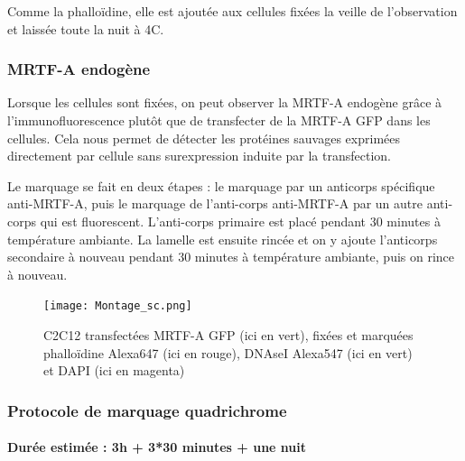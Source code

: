 		Comme la phalloïdine, elle est ajoutée aux cellules fixées la veille de l'observation et laissée toute la nuit à 4\degres   C. 
		\subsubsection{MRTF-A endogène}
		
		Lorsque les cellules sont fixées, on peut observer la MRTF-A endogène grâce à l'immunofluorescence plutôt que de transfecter de la MRTF-A GFP dans les cellules. Cela nous permet de détecter les protéines sauvages exprimées directement par cellule sans surexpression induite par la transfection. 
		
		Le marquage se fait en deux étapes : le marquage par un anticorps spécifique anti-MRTF-A, puis le marquage de l'anti-corps anti-MRTF-A par un autre anti-corps qui est fluorescent. L'anti-corps primaire est placé pendant 30 minutes à température ambiante. La lamelle est ensuite rincée et on y ajoute l'anticorps secondaire à nouveau pendant 30 minutes à température ambiante, puis on rince à nouveau. 
		 
				
		\begin{figure}
		\texttt{[image: Montage\_sc.png]}
		\caption{C2C12 transfectées MRTF-A GFP (ici en vert), fixées et marquées phalloïdine Alexa647 (ici en rouge), DNAseI Alexa547 (ici en vert) et DAPI (ici en magenta)}
		\end{figure}

\subsubsection{Protocole de marquage quadrichrome}
\paragraph{Durée estimée : 3h + 3*30 minutes + une nuit }
